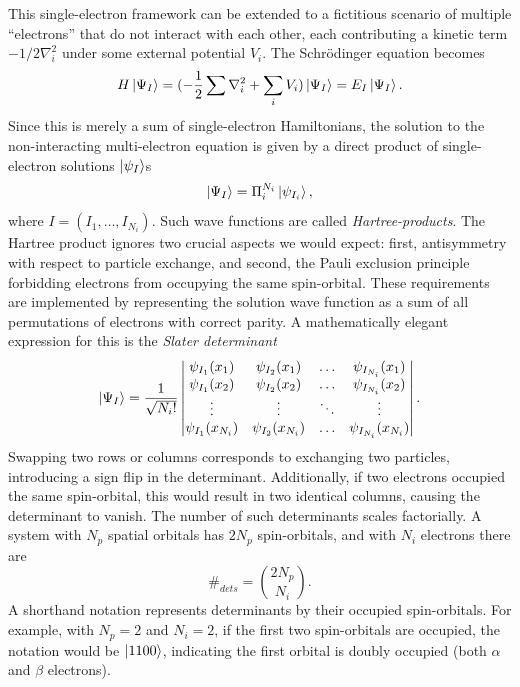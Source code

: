 \documentclass[../main.tex]{subfiles}
\begin{document}
This single-electron framework can be extended to a fictitious scenario of multiple ``electrons''  that do not interact with each other, each contributing a kinetic term $- 1/2 \nabla^2_i$ under some external potential $V_i$. The Schrödinger equation becomes
\begin{equation}
    H \ket{\Psi_I} = (- \frac{1}{2} \sum \nabla^2_i + \sum_i V_i) \ket{\Psi_I} = E_I \ket{\Psi_I}.
\end{equation} Since this is merely a sum of single-electron Hamiltonians, the solution to the non-interacting multi-electron equation is given by a direct product of single-electron solutions $\ket{\psi_I}$s
\begin{equation}
    \ket{\Psi_I} = \Pi_{i}^{N_i} \ket{\psi_{I_i}}, 
\end{equation} where $I = (I_1, \dots, I_{N_i})$. Such wave functions are called \textit{Hartree-products}.
The Hartree product ignores two crucial aspects we would expect: first, antisymmetry with respect to particle exchange, and second, the Pauli exclusion principle forbidding electrons from occupying the same spin-orbital. These requirements are implemented by representing the solution wave function as a sum of all permutations of electrons with correct parity. A mathematically elegant expression for this is the  \textit{Slater determinant}
\begin{equation}
    \ket{\Psi_I} = \frac{1}{\sqrt{N_i!}} \begin{vmatrix}
        \psi_{I_1} (x_1) &  \psi_{I_2} (x_1) & \dots  & \psi_{I_{N_i}} (x_1) \\
        \psi_{I_1} (x_2) &  \psi_{I_2} (x_2) & \dots  & \psi_{I_{N_i}} (x_2) \\
        \vdots & \vdots & \ddots & \vdots \\
        \psi_{I_1} (x_{N_i}) &  \psi_{I_2} (x_{N_i}) & \dots  & \psi_{I_{N_i}} (x_{N_i}) \\
    \end{vmatrix}.
\end{equation}
Swapping two rows or columns corresponds to exchanging two particles, introducing a sign flip in the determinant. Additionally, if two electrons occupied the same spin-orbital, this would result in two identical columns, causing the determinant to vanish. The number of such determinants scales factorially. A system with $N_p$ spatial orbitals has $2N_p$ spin-orbitals, and with $N_i$ electrons there are 
\begin{equation}
    \#_{dets} = \binom{2 N_p}{N_i}.
\end{equation} A shorthand notation represents determinants by their occupied spin-orbitals. For example, with $N_p = 2$ and $N_i=2$, if the first two spin-orbitals are occupied, the notation would be $\ket{1100}$, indicating the first orbital is doubly occupied (both $\alpha$ and $\beta$ electrons).
\end{document}
